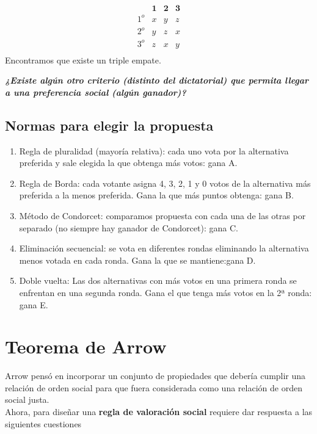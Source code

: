 \begin{ejem}
    $$
    \begin{matrix}
	& \textbf{1} & \textbf{2} & \textbf{3}\\
	1^o & x & y & z\\
	2^o & y & z & x\\
	3^o & z & x & y\\
    \end{matrix}
    $$
    Encontramos que existe un triple empate.
\end{ejem}

\textit{\textbf{¿Existe algún otro criterio (distinto del dictatorial) que permita llegar a una preferencia social (algún ganador)?}}


\subsection{Normas para elegir la propuesta}
\begin{enumerate}[\bfseries 1.]
    \item  Regla de pluralidad (mayoría relativa): cada uno vota por la alternativa preferida y sale elegida la que obtenga más votos: gana A. 
    \item Regla de Borda: cada votante asigna 4, 3, 2, 1 y 0 votos de la alternativa más preferida a la menos preferida. Gana la que más puntos obtenga: gana B. 
    \item Método de Condorcet: comparamos propuesta con cada una de las otras por separado (no siempre hay ganador de Condorcet): gana C. 
    \item Eliminación secuencial: se vota en diferentes rondas eliminando la alternativa menos votada en cada ronda. Gana la que se mantiene:gana D. 
    \item Doble vuelta: Las dos alternativas con más votos en una primera ronda se enfrentan en una segunda ronda. Gana el que tenga más votos en la 2ª ronda: gana E.
\end{enumerate}

\section{Teorema de Arrow}
Arrow pensó en incorporar un conjunto de propiedades que debería cumplir una relación de orden social para que fuera considerada como una relación de orden social justa. \\

Ahora, para diseñar una \textbf{regla de valoración social} requiere dar respuesta a las siguientes cuestiones 


